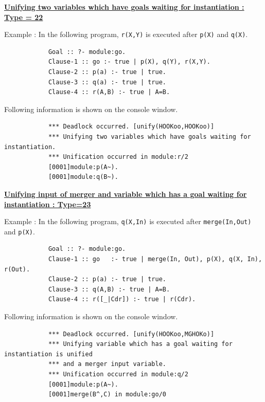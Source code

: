 \noindent\underline{\bf
Unifying two variables which have goals waiting for instantiation : Type = 22}
\vspace{1ex}\par
Example : In the following program, \verb|r(X,Y)| is executed after \verb|p(X)| and \verb|q(X)|.
\begin{verbatim}
            Goal :: ?- module:go.
            Clause-1 :: go :- true | p(X), q(Y), r(X,Y).
            Clause-2 :: p(a) :- true | true.
            Clause-3 :: q(a) :- true | true.
            Clause-4 :: r(A,B) :- true | A=B.
\end{verbatim}\par
Following information is shown on the console window.
\begin{verbatim}
            *** Deadlock occurred. [unify(HOOKoo,HOOKoo)]
            *** Unifying two variables which have goals waiting for instantiation.
            *** Unification occurred in module:r/2
            [0001]module:p(A~).
            [0001]module:q(B~).
\end{verbatim}
\vspace{1ex}

\noindent\underline{\bf
Unifying input of merger and variable which has a goal waiting for instantiation : Type=23}\vspace{1ex}\par
Example : In the following program, \verb|q(X,In)| is executed after
\verb|merge(In,Out)| and \verb|p(X)|.
\begin{verbatim}
            Goal :: ?- module:go.
            Clause-1 :: go   :- true | merge(In, Out), p(X), q(X, In), r(Out).
            Clause-2 :: p(a) :- true | true.
            Clause-3 :: q(A,B) :- true | A=B.
            Clause-4 :: r([_|Cdr]) :- true | r(Cdr).
\end{verbatim}\par
Following information is shown on the console window.
\begin{verbatim}
            *** Deadlock occurred. [unify(HOOKoo,MGHOKo)]
            *** Unifying variable which has a goal waiting for instantiation is unified
            *** and a merger input variable.
            *** Unification occurred in module:q/2
            [0001]module:p(A~).
            [0001]merge(B^,C) in module:go/0
\end{verbatim}
\vspace{1ex}

